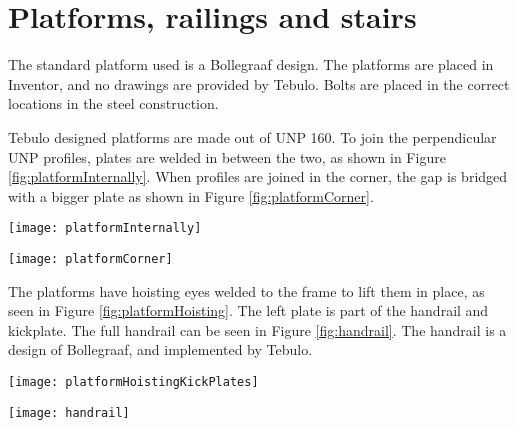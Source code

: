 \section{Platforms, railings and stairs}

The standard platform used is a Bollegraaf design. The platforms are placed in Inventor, and no drawings are provided by Tebulo. Bolts are placed in the correct locations in the steel construction.

\begin{UNPPlatform}

Tebulo designed platforms are made out of UNP 160. To join the perpendicular UNP profiles, plates are welded in between the two, as shown in Figure \ref{fig:platformInternally}. When profiles are joined in the corner, the gap is bridged with a bigger plate as shown in Figure \ref{fig:platformCorner}.\\


\begin{minipage}[b]{.47\linewidth}
	\centering
	\texttt{[image: platformInternally]}
	\label{fig:platformInternally}
\end{minipage}
\qquad
\begin{minipage}[b]{.47\linewidth}
	\centering
	\texttt{[image: platformCorner]}
	\label{fig:platformCorner}
\end{minipage}


The platforms have hoisting eyes welded to the frame to lift them in place, as seen in Figure \ref{fig:platformHoisting}. The left plate is part of the handrail and kickplate. The full handrail can be seen in Figure \ref{fig:handrail}. The handrail is a design of Bollegraaf, and implemented by Tebulo.\\


\begin{minipage}[b]{.47\linewidth}
	\centering
	\texttt{[image: platformHoistingKickPlates]}
	\label{fig:platformHoisting}
\end{minipage}
\qquad
\begin{minipage}[b]{.47\linewidth}
	\centering
	\texttt{[image: handrail]}
	\label{fig:handrail}
\end{minipage}
\vspace{.5cm}



\end{UNPPlatform}
